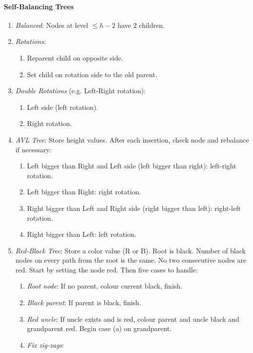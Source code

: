 \documentclass[twocolumn,english]{article}
\begin{document}
\paragraph{Self-Balancing Trees}
\begin{enumerate}
\item \emph{Balanced}: Nodes at level $\leq h-2$ have 2 children.
\item \emph{Rotations}:

\begin{enumerate}
\item Reparent child on opposite side.
\item Set child on rotation side to the old parent.
\end{enumerate}
\item \emph{Double Rotations }(e.g. Left-Right rotation):

\begin{enumerate}
\item Left side (left rotation).
\item Right rotation.
\end{enumerate}
\item \emph{AVL Tree}: Store height values. After each insertion, check
node and rebalance if necessary:

\begin{enumerate}
\item Left bigger than Right and Left side (left bigger than right): left-right
rotation.
\item Left bigger than Right: right rotation.
\item Right bigger than Left and Right side (right bigger than left): right-left
rotation.
\item Right bigger than Left: left rotation.
\end{enumerate}
\item \emph{Red-Black Tree}: Store a color value (R or B). Root is black.
Number of black nodes on every path from the root is the same. No
two consecutive nodes are red. Start by setting the node red. Then
five cases to handle:

\begin{enumerate}
\item \emph{Root node}: If no parent, colour current black, finish.
\item \emph{Black parent}: If parent is black, finish.
\item \emph{Red uncle}: If uncle exists and is red, colour parent and uncle
black and grandparent red. Begin case (a) on grandparent.
\item \emph{Fix zig-zags}: 


\end{enumerate}
\end{enumerate}
\end{document}
